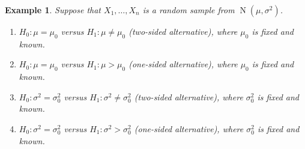 \documentclass[10pt]{article}
\DeclareMathOperator{\Nor}{N}
\theoremstyle{newstyle}
\newtheorem{exmp}[thm]{Example}
\begin{document}
\begin{exmp}
Suppose that $X_1, \dots, X_n$ is a random sample from $\Nor(\mu, \sigma^2)$. 
\begin{enumerate}[(1)]
    \item $H_0 : \mu = \mu_0$ versus $H_1 : \mu \neq \mu_0$ (two-sided alternative), where $\mu_0$ 
    is fixed and known. 
    \item $H_0 : \mu = \mu_0$ versus $H_1 : \mu > \mu_0$ (one-sided alternative), where $\mu_0$ 
    is fixed and known.
    \item $H_0 : \sigma^2 = \sigma_0^2$ versus $H_1 : \sigma^2 \neq \sigma_0^2$ (two-sided alternative), where $\sigma_0^2$ is fixed and known.
    \item $H_0 : \sigma^2 = \sigma_0^2$ versus $H_1 : \sigma^2 > \sigma_0^2$ (one-sided alternative), where $\sigma_0^2$ is fixed and known.
\end{enumerate}
\end{exmp}
\end{document}
